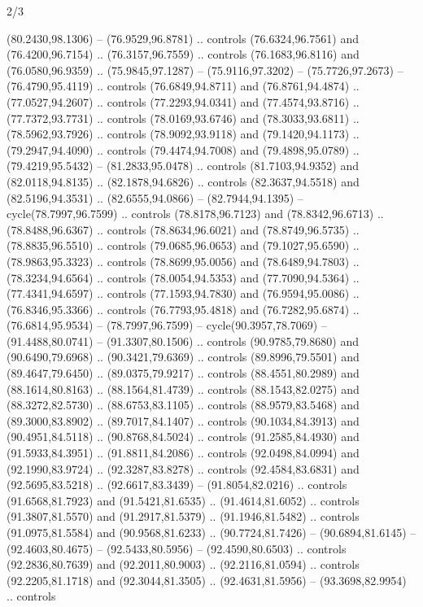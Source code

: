 \begin{flagdescription}{2/3}
\begin{scope}[scale=0.00214\flagwidth,yshift=164.5mm]
\begin{scope}[y=-0.8pt, x=0.8pt, inner sep=0pt, outer sep=0pt]
\begin{scope}[fill=black]
  (80.2430,98.1306) -- (76.9529,96.8781) .. controls (76.6324,96.7561) and
  (76.4200,96.7154) .. (76.3157,96.7559) .. controls (76.1683,96.8116) and
  (76.0580,96.9359) .. (75.9845,97.1287) -- (75.9116,97.3202) --
  (75.7726,97.2673) -- (76.4790,95.4119) .. controls (76.6849,94.8711) and
  (76.8761,94.4874) .. (77.0527,94.2607) .. controls (77.2293,94.0341) and
  (77.4574,93.8716) .. (77.7372,93.7731) .. controls (78.0169,93.6746) and
  (78.3033,93.6811) .. (78.5962,93.7926) .. controls (78.9092,93.9118) and
  (79.1420,94.1173) .. (79.2947,94.4090) .. controls (79.4474,94.7008) and
  (79.4898,95.0789) .. (79.4219,95.5432) -- (81.2833,95.0478) .. controls
  (81.7103,94.9352) and (82.0118,94.8135) .. (82.1878,94.6826) .. controls
  (82.3637,94.5518) and (82.5196,94.3531) .. (82.6555,94.0866) --
  (82.7944,94.1395) -- cycle(78.7997,96.7599) .. controls (78.8178,96.7123) and
  (78.8342,96.6713) .. (78.8488,96.6367) .. controls (78.8634,96.6021) and
  (78.8749,96.5735) .. (78.8835,96.5510) .. controls (79.0685,96.0653) and
  (79.1027,95.6590) .. (78.9863,95.3323) .. controls (78.8699,95.0056) and
  (78.6489,94.7803) .. (78.3234,94.6564) .. controls (78.0054,94.5353) and
  (77.7090,94.5364) .. (77.4341,94.6597) .. controls (77.1593,94.7830) and
  (76.9594,95.0086) .. (76.8346,95.3366) .. controls (76.7793,95.4818) and
  (76.7282,95.6874) .. (76.6814,95.9534) -- (78.7997,96.7599) --
  cycle(90.3957,78.7069) -- (91.4488,80.0741) -- (91.3307,80.1506) .. controls
  (90.9785,79.8680) and (90.6490,79.6968) .. (90.3421,79.6369) .. controls
  (89.8996,79.5501) and (89.4647,79.6450) .. (89.0375,79.9217) .. controls
  (88.4551,80.2989) and (88.1614,80.8163) .. (88.1564,81.4739) .. controls
  (88.1543,82.0275) and (88.3272,82.5730) .. (88.6753,83.1105) .. controls
  (88.9579,83.5468) and (89.3000,83.8902) .. (89.7017,84.1407) .. controls
  (90.1034,84.3913) and (90.4951,84.5118) .. (90.8768,84.5024) .. controls
  (91.2585,84.4930) and (91.5933,84.3951) .. (91.8811,84.2086) .. controls
  (92.0498,84.0994) and (92.1990,83.9724) .. (92.3287,83.8278) .. controls
  (92.4584,83.6831) and (92.5695,83.5218) .. (92.6617,83.3439) --
  (91.8054,82.0216) .. controls (91.6568,81.7923) and (91.5421,81.6535) ..
  (91.4614,81.6052) .. controls (91.3807,81.5570) and (91.2917,81.5379) ..
  (91.1946,81.5482) .. controls (91.0975,81.5584) and (90.9568,81.6233) ..
  (90.7724,81.7426) -- (90.6894,81.6145) -- (92.4603,80.4675) --
  (92.5433,80.5956) -- (92.4590,80.6503) .. controls (92.2836,80.7639) and
  (92.2011,80.9003) .. (92.2116,81.0594) .. controls (92.2205,81.1718) and
  (92.3044,81.3505) .. (92.4631,81.5956) -- (93.3698,82.9954) .. controls

\end{scope}
\end{scope}
\end{scope}
\end{flagdescription}
